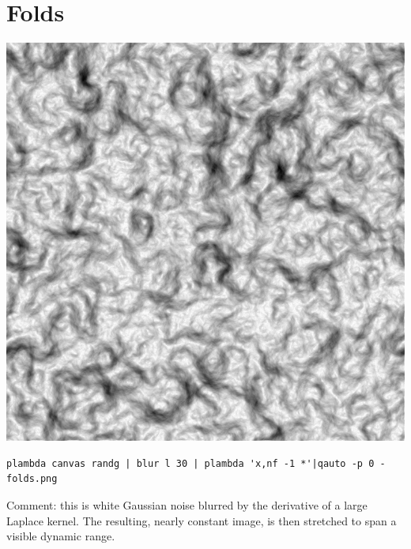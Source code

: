 \section{Folds}
\includegraphics{folds.png}
\begin{verbatim}
plambda canvas randg | blur l 30 | plambda 'x,nf -1 *'|qauto -p 0 - folds.png
\end{verbatim}
Comment: this is white Gaussian noise blurred by the derivative of a large
Laplace kernel.  The resulting, nearly constant image, is then stretched to
span a visible dynamic range.


